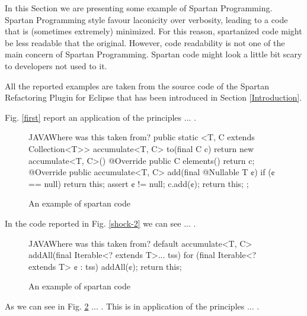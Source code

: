 % 
% 

In this Section we are presenting some example of Spartan Programming.
Spartan Programming style favour laconicity over verbosity, leading to 
a code that is (sometimes extremely) minimized. For this reason, spartanized code might 
be less readable that the original. However, code readability is not one of 
the main concern of Spartan Programming. Spartan code might look a little bit
scary to developers not used to it.

All the reported examples are taken from the source code of the Spartan Refactoring 
Plugin for Eclipse that has been introduced in Section \ref{Introduction}. 

Fig. \ref{first} report an application of the principles ... .

\begin{figure}[h]
\label{figure:first}
\caption{An example of spartan code}
  \begin{Code}{JAVA}{Where was this taken from?}
public static <T, C extends Collection<T>> accumulate<T, C> 
  to(final C c) {
    return new accumulate<T, C>() {
      @Override public C elements() {
        return c;
      }
      @Override public accumulate<T, C> 
        add(final @Nullable T ¢) {
          if (¢ == null)
            return this;
          assert ¢ != null;
          c.add(¢);
          return this;
        }
    };
  }
\end{Code}
\end{figure}

In the code reported in Fig. \ref{shock-2} we can see ... .

\begin{figure}[h]
\label{figure:shock-2}
\caption{An example of spartan code}
\begin{Code}{JAVA}{Where was this taken from?}
default accumulate<T, C> 
    addAll(final Iterable<? extends T>... tss) {
      for (final Iterable<? extends T> ¢ : tss)
        addAll(¢);
      return this;
    }
\end{Code}

\end{figure}

As we can see in Fig. \ref{figure:shock-2} ... . This is 
in application of the principles ... .

